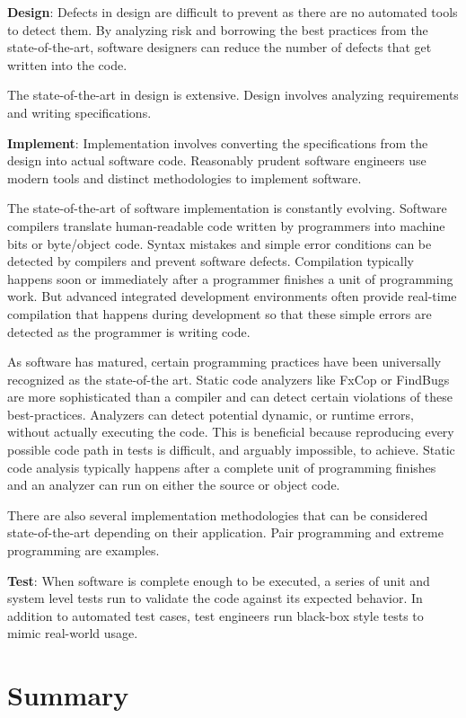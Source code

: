 \documentclass[12pt]{report}
\begin{document}
\textbf{Design}: Defects in design are difficult to prevent as there are no automated tools to detect them. By analyzing risk and borrowing the best practices from the state-of-the-art, software designers can reduce the number of defects that get written into the code.

The state-of-the-art in design is extensive. Design involves analyzing requirements and writing specifications.

\textbf{Implement}: Implementation involves converting the specifications from the design into actual software code. Reasonably prudent software engineers use modern tools and distinct methodologies to implement software.

The state-of-the-art of software implementation is constantly evolving. Software compilers translate human-readable code written by programmers into machine bits or byte/object code. Syntax mistakes and simple error conditions can be detected by compilers and prevent software defects. Compilation typically happens soon or immediately after a programmer finishes a unit of programming work. But advanced integrated development environments often provide real-time compilation that happens during development so that these simple errors are detected as the programmer is writing code. 

As software has matured, certain programming practices have been universally recognized as the state-of-the art. Static code analyzers like FxCop or FindBugs are more sophisticated than a compiler and can detect certain violations of these best-practices. Analyzers can detect potential dynamic, or runtime errors, without actually executing the code. This is beneficial because reproducing every possible code path in tests is difficult, and arguably impossible, to achieve. Static code analysis typically happens after a complete unit of programming finishes and an analyzer can run on either the source or object code.

There are also several implementation methodologies that can be considered state-of-the-art depending on their application. Pair programming and extreme programming are examples.

\textbf{Test}: When software is complete enough to be executed, a series of unit and system level tests run to validate the code against its expected behavior. In  addition to automated test cases, test engineers run black-box style tests to mimic real-world usage. 

\section{Summary}
\end{document}
